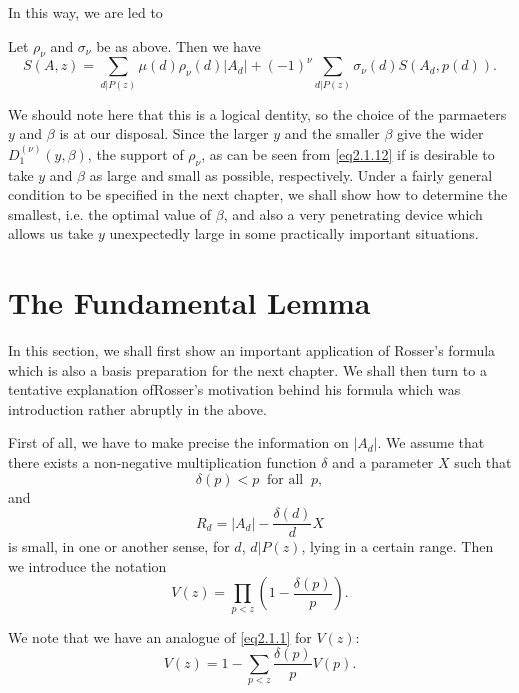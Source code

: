 In this way, we are led to 
\begin{Lemma}\label{chap2-lem8}
Let $\rho_\nu$ and $\sigma_\nu$ be as above. Then
we have  
\begin{equation*}
  S(A,z)=  \sum_{d|P(z)} \mu (d) \rho_\nu (d)|A_d| +(-1)^\nu
  \sum_{d|P(z)} \sigma_\nu (d) S(A_d,p(d)). \tag{2.1.14} \label{eq2.1.14}
\end{equation*}
\end{Lemma}

We should note here that this is a logical dentity, so the choice of the
parmaeters $y$ and $\beta$ is at our disposal. Since the larger $y$
and the smaller $\beta$ give the wider $D^{(\nu)}_1(y, \beta)$, the
support of $\rho_\nu$, as can be seen from \eqref{eq2.1.12} if is desirable
to take $y$ and $\beta$ as large and small as possible,
respectively. Under a fairly general condition to be specified in the
next chapter, we shall show how to determine the smallest, i.e. the
optimal value of $\beta$, and also a very penetrating device which
allows us take $y$ unexpectedly large in some practically important
situations. 

\section{The Fundamental Lemma}\label{chap2-sec2.2}%

In this section, we shall first show an important application of
Rosser's formula which is also a basis preparation for the next
chapter. We shall then turn to a tentative explanation of\pageoriginale Rosser's
motivation behind his formula which was introduction rather abruptly
in the above. 

First of all, we have to make precise the information on $|A_d|$. We
assume that there exists a non-negative multiplication function
$\delta$ and a parameter $X$ such that  
\begin{equation*}
\delta(p) < p ~\text{ for all }~ p,
\end{equation*}
and
\begin{equation*}
R_d= |A_d|- \frac{\delta(d)}{d} X \tag{2.2.1}\label{eq2.2.1}
\end{equation*}
is small, in one or another sense, for $d$, $d|P(z)$, lying in a certain
range. Then we introduce the notation  
$$
V(z) = \prod_{p < z}\left(1- \frac{\delta(p)}{p}\right).
$$ 

We note that we have an analogue of \eqref{eq2.1.1} for $V(z)$:
$$
V(z)=1- \sum_{p < z} \frac{\delta(p)}{p} V(p).
$$

